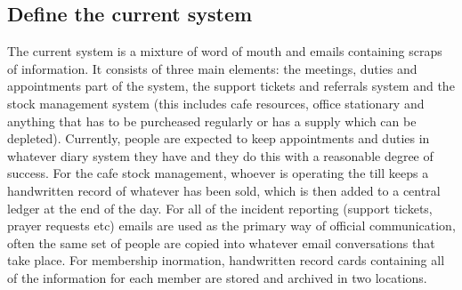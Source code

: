 \subsection{Define the current system}
	The current system is a mixture of word of mouth and emails containing scraps of information. It consists of three main elements: the meetings, duties and appointments part of the system, the support tickets and referrals system and the stock management system (this includes cafe resources, office stationary and anything that has to be purcheased regularly or has a supply which can be depleted). Currently, people are expected to keep appointments and duties in whatever diary system they have and they do this with a reasonable degree of success. For the cafe stock management, whoever is operating the till keeps a handwritten record of whatever has been sold, which is then added to a central ledger at the end of the day. For all of the incident reporting (support tickets, prayer requests etc) emails are used as the primary way of official communication, often the same set of people are copied into whatever email conversations that take place. For membership inormation, handwritten record cards containing all of the information for each member are stored and archived in two locations.


